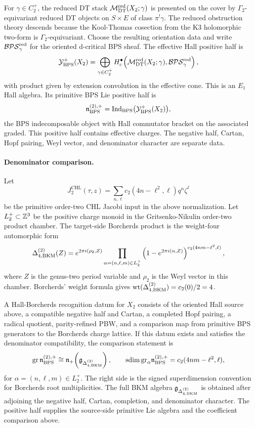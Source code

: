 For $\gamma\in C_2^+$, the reduced DT stack
$\mathcal{M}_{\mathrm{DT}}^{\mathrm{red}}(X_2;\gamma)$ is presented on the cover by
$\Gamma_2$-equivariant reduced DT objects on $S\times E$ of class
$\pi^!\gamma$.  The reduced obstruction theory descends because the
Kool-Thomas cosection from the K3 holomorphic two-form is
$\Gamma_2$-equivariant.  Choose the resulting orientation data and write
$\mathcal{BPS}^{\mathrm{red}}_{\gamma}$ for the oriented d-critical BPS sheaf.  The
effective Hall positive half is
\[
  \mathcal{Y}^+_{\mathrm{BPS}}(X_2)
  =
  \bigoplus_{\gamma\in C_2^+}
  H^\bullet_c\!\left(
    \mathcal{M}_{\mathrm{DT}}^{\mathrm{red}}(X_2;\gamma),
    \mathcal{BPS}^{\mathrm{red}}_{\gamma}
  \right),
\]
with product given by extension convolution in the effective cone.
This is an $E_1$ Hall algebra.  Its primitive BPS Lie positive half is
\[
  \mathfrak{n}^{(2),+}_{\mathrm{BPS}}
  =
  \mathrm{Ind}_{\mathrm{BPS}}\bigl(\mathcal{Y}^+_{\mathrm{BPS}}(X_2)\bigr),
\]
the BPS indecomposable object with Hall commutator bracket on the
associated graded.  This positive half contains effective charges.  The
negative half, Cartan, Hopf pairing, Weyl vector, and denominator
character are separate data.

\paragraph{Denominator comparison.}
Let
\[
  J^{\mathrm{CHL}}_2(\tau,z)
  =
  \sum_{n,\ell}c_2(4n-\ell^2,\ell)q^n\zeta^\ell
\]
be the primitive order-two CHL Jacobi input in the above normalization.
Let $L_2^+\subset \mathbb{Z}^3$ be the positive charge monoid in the
Gritsenko-Nikulin order-two product chamber.  The target-side
Borcherds product is the weight-four automorphic form
\[
  \Delta^{(2)}_{4,\mathrm{BKM}}(Z)
  =
  e^{2\pi i(\rho_2,Z)}
  \prod_{\alpha=(n,\ell,m)\in L_2^+}
  \left(1-e^{2\pi i(\alpha,Z)}\right)^{
    c_2(4nm-\ell^2,\ell)
  },
\]
where $Z$ is the genus-two period variable and $\rho_2$ is the Weyl
vector in this chamber.  Borcherds' weight formula gives
$\mathrm{wt}(\Delta^{(2)}_{4,\mathrm{BKM}})=c_2(0)/2=4$.

A Hall-Borcherds recognition datum for $X_2$ consists of the oriented
Hall source above, a compatible negative half and Cartan, a completed
Hopf pairing, a radical quotient, parity-refined PBW, and a comparison
map from primitive BPS generators to the Borcherds charge lattice.  If
this datum exists and satisfies the denominator compatibility, the
comparison statement is
\[
  \mathrm{gr}\,\mathfrak{n}^{(2),+}_{\mathrm{BPS}}
  \cong
  \mathfrak{n}_+\!\left(\mathfrak{g}_{\Delta^{(2)}_{4,\mathrm{BKM}}}\right),
  \qquad
  \mathrm{sdim}\,\mathrm{gr}_\alpha\mathfrak{n}^{(2),+}_{\mathrm{BPS}}
  =
  c_2(4nm-\ell^2,\ell),
\]
for $\alpha=(n,\ell,m)\in L_2^+$.  The right side is the signed
superdimension convention for Borcherds root multiplicities.  The full
BKM algebra
$\mathfrak{g}_{\Delta^{(2)}_{4,\mathrm{BKM}}}$ is obtained after adjoining the negative
half, Cartan, completion, and denominator character.  The positive half
supplies the source-side primitive Lie algebra and the coefficient
comparison above.

